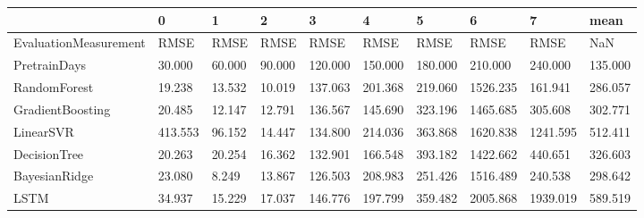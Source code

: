 \begin{tabular}{llllllllll}
\toprule
{} &       0 &      1 &      2 &       3 &       4 &       5 &        6 &        7 &    mean \\
\midrule
EvaluationMeasurement &    RMSE &   RMSE &   RMSE &    RMSE &    RMSE &    RMSE &     RMSE &     RMSE &     NaN \\
PretrainDays          &  30.000 & 60.000 & 90.000 & 120.000 & 150.000 & 180.000 &  210.000 &  240.000 & 135.000 \\
RandomForest          &  19.238 & 13.532 & 10.019 & 137.063 & 201.368 & 219.060 & 1526.235 &  161.941 & 286.057 \\
GradientBoosting      &  20.485 & 12.147 & 12.791 & 136.567 & 145.690 & 323.196 & 1465.685 &  305.608 & 302.771 \\
LinearSVR             & 413.553 & 96.152 & 14.447 & 134.800 & 214.036 & 363.868 & 1620.838 & 1241.595 & 512.411 \\
DecisionTree          &  20.263 & 20.254 & 16.362 & 132.901 & 166.548 & 393.182 & 1422.662 &  440.651 & 326.603 \\
BayesianRidge         &  23.080 &  8.249 & 13.867 & 126.503 & 208.983 & 251.426 & 1516.489 &  240.538 & 298.642 \\
LSTM                  &  34.937 & 15.229 & 17.037 & 146.776 & 197.799 & 359.482 & 2005.868 & 1939.019 & 589.519 \\
\bottomrule
\end{tabular}
